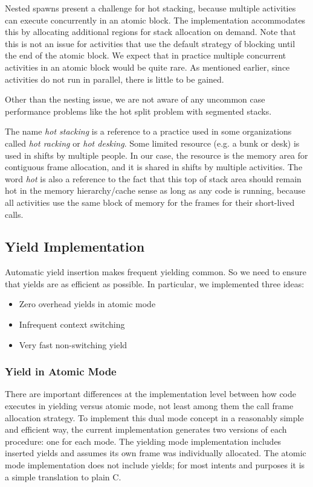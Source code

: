 \documentclass[sigplan,10pt,review,anonymous]{acmart}\settopmatter{printfolios=true,printccs=false,printacmref=false}
\begin{document}
Nested spawns present a challenge for hot stacking, because multiple activities can execute concurrently in an atomic block.
The implementation accommodates this by allocating additional regions for stack allocation on demand.
Note that this is not an issue for activities that use the default strategy of blocking until the end of the atomic block.
We expect that in practice multiple concurrent activities in an atomic block would be quite rare.
As mentioned earlier, since activities do not run in parallel, there is little to be gained.

Other than the nesting issue, we are not aware of any uncommon case performance problems like the hot split problem with segmented stacks.

The name \emph{hot stacking} is a reference to a practice used in some organizations called \emph{hot racking} or \emph{hot desking}.
Some limited resource (e.g. a bunk or desk) is used in shifts by multiple people.
In our case, the resource is the memory area for contiguous frame allocation, and it is shared in shifts by multiple activities.
The word \emph{hot} is also a reference to the fact that this top of stack area should remain hot in the memory hierarchy/cache sense as long as any code is running, because all activities use the same block of memory for the frames for their short-lived calls.

\subsection{Yield Implementation}
\label{sec:yield_imp}

Automatic yield insertion makes frequent yielding common.
So we need to ensure that yields are as efficient as possible.
In particular, we implemented three ideas:

\begin{itemize}
\item Zero overhead yields in atomic mode
\item Infrequent context switching
\item Very fast non-switching yield
\end{itemize}

\subsubsection{Yield in Atomic Mode}

There are important differences at the implementation level between how code executes in yielding versus atomic mode, not least among them the call frame allocation strategy.
To implement this dual mode concept in a reasonably simple and efficient way, the current \charcoal{} implementation generates two versions of each procedure: one for each mode.
The yielding mode implementation includes inserted yields and assumes its own frame was individually allocated.
The atomic mode implementation does not include yields; for most intents and purposes it is a simple translation to plain C.
\end{document}
